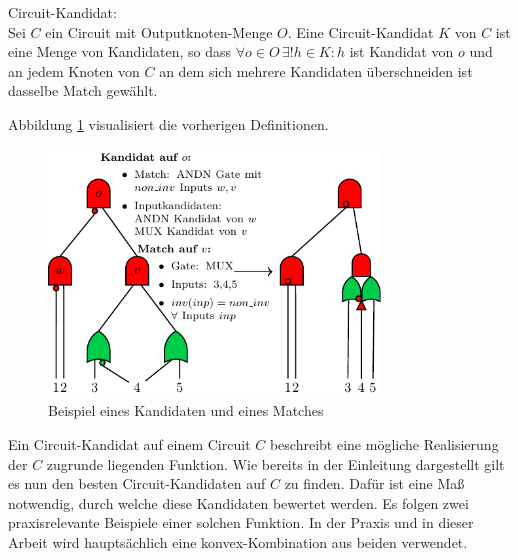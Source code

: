 \documentclass[11pt, a4paper, german]{article}
\begin{document}
\begin{definition}{Circuit-Kandidat:}\\
Sei $C$ ein Circuit mit Outputknoten-Menge $O$. Eine Circuit-Kandidat $K$ von $C$ ist eine Menge von Kandidaten, so dass $\forall o \in O \, \exists!  h  \in K : h$ ist Kandidat von $ o$ und an jedem Knoten von $C$ an dem sich mehrere Kandidaten überschneiden ist dasselbe Match gewählt.
\end{definition}
\newpage
Abbildung \ref{bild:grundl_definitionen} visualisiert die vorherigen Definitionen.\\
\begin{figure}[h]
\begin{center}
 \includegraphics[width = 250pt]{./pictures/compiled/grundl_def_veransch.pdf}
 \caption{Beispiel eines  Kandidaten und eines Matches}
 \label{bild:grundl_definitionen}
\end{center}
\end{figure}

Ein Circuit-Kandidat auf einem Circuit $C$ beschreibt eine mögliche Realisierung der $C$ zugrunde liegenden Funktion.  Wie bereits in der Einleitung dargestellt gilt es nun den besten Circuit-Kandidaten auf $C$ zu finden. Dafür ist eine Maß notwendig, durch welche diese Kandidaten bewertet werden. Es folgen zwei praxisrelevante Beispiele einer solchen Funktion. In der Praxis und in dieser Arbeit wird hauptsächlich eine konvex-Kombination aus beiden verwendet.
\end{document}
